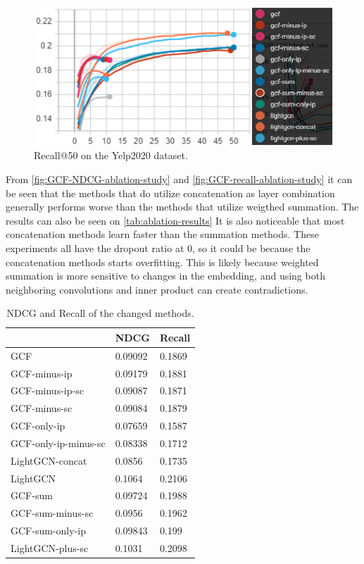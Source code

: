 \begin{figure}[h!]
    \includegraphics[width=\linewidth]{figures/gcf-all-recall.png}
    \caption{Recall@50 on the Yelp2020 dataset.}
    \label{fig:GCF-recall-ablation-study}
\end{figure}
From \autoref{fig:GCF-NDCG-ablation-study} and \autoref{fig:GCF-recall-ablation-study} it can be seen that the methods that do utilize concatenation as layer combination generally performs worse than the methods that utilize weigthed summation.
The results can also be seen on \autoref{tab:ablation-results}
It is also noticeable that most concatenation methods learn faster than the summation methods.
These experiments all have the dropout ratio at 0, so it could be because the concatenation methods starts overfitting.
This is likely because weighted summation is more sensitive to changes in the embedding, and using both neighboring convolutions and inner product can create contradictions.
\begin{table}[]
    \centering
    \begin{tabular}{|l|l|l|}
        \hline
                             & NDCG    & Recall \\ \hline
        GCF                  & 0.09092 & 0.1869 \\ \hline
        GCF-minus-ip         & 0.09179 & 0.1881 \\ \hline
        GCF-minus-ip-sc      & 0.09087 & 0.1871 \\ \hline
        GCF-minus-sc         & 0.09084 & 0.1879 \\ \hline
        GCF-only-ip          & 0.07659 & 0.1587 \\ \hline
        GCF-only-ip-minus-sc & 0.08338 & 0.1712 \\ \hline
        LightGCN-concat      & 0.0856  & 0.1735 \\ \hline
        LightGCN             & 0.1064  & 0.2106 \\ \hline
        GCF-sum              & 0.09724 & 0.1988 \\ \hline
        GCF-sum-minus-sc     & 0.0956  & 0.1962 \\ \hline
        GCF-sum-only-ip      & 0.09843 & 0.199  \\ \hline
        LightGCN-plus-sc     & 0.1031  & 0.2098 \\ \hline
    \end{tabular}
    \caption{NDCG and Recall of the changed methods.}
    \label{tab:ablation-results}
\end{table}
